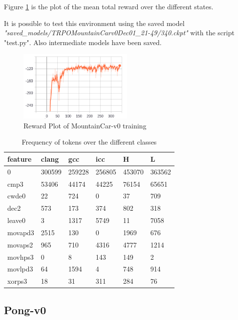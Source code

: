 \documentclass[12pt,a4paper]{article}
\begin{document}
Figure \ref{fig:mountaincar_reward} is the plot of the mean total reward over the different states.

It is possible to test this environment using the saved model \textit{"saved\_models/TRPO\-MountainCar\-v0\-Dec01\_21-49/340.ckpt"} with the script "test.py". Also intermediate models have been saved.

\begin{figure}[H]
    \centering
    \includegraphics[width=0.5\textwidth]{mountaincar_reward.png}
    \caption{Reward Plot of MountainCar-v0 training}
    \label{fig:mountaincar_reward}
\end{figure}


\begin{table}[H]
\centering
\begin{tabular}{llllll}
\hline
feature & clang  & gcc    & icc    & H      & L      \\ \hline
0       & 300599 & 259228 & 256805 & 453070 & 363562 \\
cmp3    & 53406  & 44174  & 44225  & 76154  & 65651  \\
cwde0   & 22     & 724    & 0      & 37     & 709    \\
dec2    & 573    & 173    & 374    & 802    & 318    \\
leave0  & 3      & 1317   & 5749   & 11     & 7058   \\
movapd3 & 2515   & 130    & 0      & 1969   & 676    \\
movaps2 & 965    & 710    & 4316   & 4777   & 1214   \\
movhps3 & 0      & 8      & 143    & 149    & 2      \\
movlpd3 & 64     & 1594   & 4      & 748    & 914    \\
xorps3  & 18     & 31     & 311    & 284    & 76     \\ \hline
\end{tabular}
\caption{Frequency of tokens over the different classes}
\label{tab:features-frequencies}
\end{table}
\subsection{Pong-v0}
\end{document}
